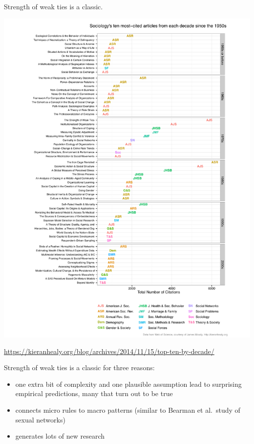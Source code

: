 \documentclass[aspectratio=169]{beamer}
\begin{document}
\begin{frame}

Strength of weak ties is a classic. \pause

\begin{center}
\includegraphics[height=0.85\textheight]{figures/cite-dotplot-by-decade-grouped-prod}
\end{center}

\vfill
\tiny{\url{https://kieranhealy.org/blog/archives/2014/11/15/top-ten-by-decade/}}


\end{frame}
\begin{frame}

Strength of weak ties is a classic for three reasons:
\pause
\begin{itemize}
\item one extra bit of complexity and one plausible assumption lead to surprising empirical predictions, many that turn out to be true \pause
\item connects micro rules to macro patterns (similar to Bearman et al.\ study of sexual networks) \pause
\item generates lots of new research 
\end{itemize}

\end{frame}
\end{document}
